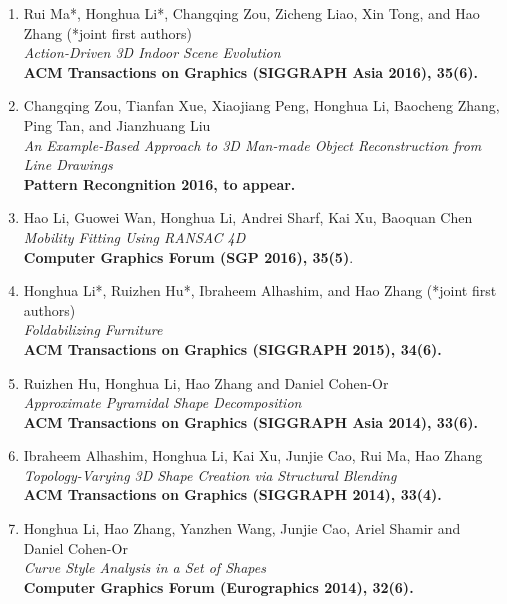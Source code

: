 \documentclass[10pt]{article}
\begin{document}
	\begin{enumerate}
		\item Rui Ma*, Honghua Li*, Changqing Zou, Zicheng Liao, Xin Tong, and Hao Zhang (*joint first authors) \\ 
		\textit{Action-Driven 3D Indoor Scene Evolution} \\
		\textbf{ACM Transactions on Graphics (SIGGRAPH Asia 2016), 35(6).}
		
		\item Changqing Zou, Tianfan Xue, Xiaojiang Peng, Honghua Li, Baocheng Zhang, Ping Tan, and Jianzhuang Liu\\
		\textit{An Example-Based Approach to 3D Man-made Object Reconstruction from Line Drawings}\\
		\textbf{Pattern Recongnition 2016, to appear.}
	
		\item Hao Li, Guowei Wan, Honghua Li, Andrei Sharf, Kai Xu, Baoquan Chen\\
		\textit{Mobility Fitting Using RANSAC 4D}\\
		\textbf{Computer Graphics Forum (SGP 2016), 35(5)}.
		
		\item Honghua Li*, Ruizhen Hu*, Ibraheem Alhashim, and Hao Zhang (*joint first authors) \\ \textit{Foldabilizing Furniture} \\
		\textbf{ACM Transactions on Graphics (SIGGRAPH 2015), 34(6).}
		
		\item Ruizhen Hu, Honghua Li, Hao Zhang and Daniel Cohen-Or\\ \textit{Approximate Pyramidal Shape	Decomposition} \\
		\textbf{ACM Transactions on Graphics (SIGGRAPH Asia 2014), 33(6).}
		
		\item Ibraheem Alhashim, Honghua Li, Kai Xu, Junjie Cao, Rui Ma, Hao Zhang \\
		\textit{Topology-Varying 3D Shape Creation via Structural Blending} \\
		\textbf{ACM Transactions on Graphics (SIGGRAPH 2014), 33(4).}
		
		\item Honghua Li, Hao Zhang, Yanzhen Wang, Junjie Cao, Ariel Shamir and Daniel Cohen-Or\\
		\textit{Curve Style Analysis in a Set of Shapes}\\
		\textbf{Computer Graphics Forum (Eurographics 2014), 32(6).}
		

\end{enumerate}
\end{document}
